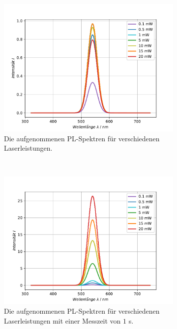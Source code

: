 \begin{figure}[H]
\centering
	\begin{subfigure}[t]{0.45\textwidth}
	\includegraphics[width=\textwidth]{Plots/aufgabe1c2.pdf}
	\caption{Die aufgenommenen PL-Spektren f\"{u}r verschiedenen Laserleistungen.}
	\label{abb:verLeistung}
	\end{subfigure}
	~
	\begin{subfigure}[t]{0.45\textwidth}
	\includegraphics[width=\textwidth]{Plots/aufgabe1c2_1s.pdf}
	\caption{Die aufgenommenen PL-Spektren f\"{u}r verschiedenen Laserleistungen mit einer Messzeit von $1$ s.}
	\label{abb:verLeistung}
	\end{subfigure}
	~
	\begin{subfigure}[t]{0.45\textwidth}

\end{subfigure}
\end{figure}
